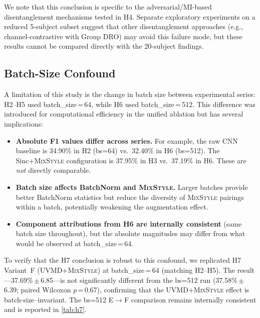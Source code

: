 \documentclass[conference]{IEEEtran}
\newcommand{\mixstyle}{\textsc{MixStyle}}
\newcommand{\uvmd}{\textsc{UVMD}}
\begin{document}
We note that this conclusion is specific to the adversarial/MI-based disentanglement mechanisms tested in H4.
Separate exploratory experiments on a reduced 5-subject subset suggest that other disentanglement approaches (e.g., channel-contrastive with Group DRO) may avoid this failure mode, but these results cannot be compared directly with the 20-subject findings.

\subsection{Batch-Size Confound}
\label{sec:batchsize}

A limitation of this study is the change in batch size between experimental series: H2--H5 used batch\_size\,=\,64, while H6 used batch\_size\,=\,512.
This difference was introduced for computational efficiency in the unified ablation but has several implications:
\begin{itemize}
    \item \textbf{Absolute F1 values differ across series.} For example, the raw CNN baseline is 34.90\% in H2 (bs=64) vs.\ 32.40\% in H6 (bs=512). The Sinc+\mixstyle{} configuration is 37.95\% in H3 vs.\ 37.19\% in H6. These are \emph{not} directly comparable.
    \item \textbf{Batch size affects BatchNorm and \mixstyle{}.} Larger batches provide better BatchNorm statistics but reduce the diversity of \mixstyle{} pairings within a batch, potentially weakening the augmentation effect.
    \item \textbf{Component attributions from H6 are internally consistent} (same batch size throughout), but the absolute magnitudes may differ from what would be observed at batch\_size\,=\,64.
\end{itemize}
To verify that the H7 conclusion is robust to this confound, we replicated H7 Variant~F (\uvmd{}+\mixstyle{}) at batch\_size\,=\,64 (matching H2--H5).
The result---37.69\%\,$\pm$\,6.85---is not significantly different from the bs=512 run (37.58\%\,$\pm$\,6.39; paired Wilcoxon $p$\,=\,0.67), confirming that the \uvmd{}+\mixstyle{} effect is batch-size--invariant.
The bs=512 E$\to$F comparison remains internally consistent and is reported in \cref{tab:h7}.
\end{document}
